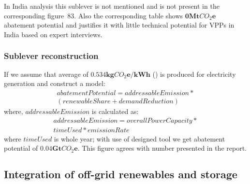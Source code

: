 \documentclass[11pt, twocolumn]{article}
\begin{document}
In India analysis this sublever is not mentioned and is not present in the corresponding figure~83. Also the corresponding table shows $\mathbf{0} \mathbf{Mt}CO_2\mathbf{e}$ abatement potential and justifies it with little technical potential for VPPs in India based on expert interviews.


\subsubsection{Sublever reconstruction\label{sec:vpp:reconstruction}}
If we assume that average of $\mathbf{0.534 kg}CO_2\mathbf{e}/\mathbf{kWh}$ (\citep{iea2012co2}) is produced for electricity generation and construct a model:\\
\begin{gather*}
    abatementPotential = addressableEmission * \\ 
    ( renewableShare + demandReduction )
\end{gather*}
where, $addressableEmission$ is calculated as:\\
\begin{gather*}
  addressableEmission = overallPowerCapacity *\\
  timeUsed * emissionRate
\end{gather*}
where $timeUsed$ is whole year; with use of designed tool we get abatement potential of $\mathbf{0.04} \mathbf{Gt}CO_2\mathbf{e}$. This figure agrees with number presented in the report.



\subsection{Integration of off-grid renewables and storage}
\end{document}

